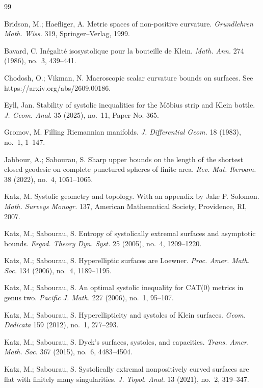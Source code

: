 \documentclass[12pt,reqno]{amsart}
\theoremstyle{definition}
\numberwithin{equation}{section}
\numberwithin{equation}{section}
\begin{document}
\begin{thebibliography}{99}

 Bridson, M.; Haefliger, A. Metric spaces of non-positive
  curvature.  \emph{Grundlehren Math. Wiss.} 319, Springer--Verlag,
  1999.

Bavard, C. In\'egalit\'e isosystolique pour la bouteille de Klein.
\emph{Math. Ann.} 274 (1986), no.~3, 439--441.

Chodosh, O.; Vikman, N. Macroscopic scalar curvature bounds on surfaces.
See https://arxiv.org/abs/2609.00186.

 Eyll, Jan.  Stability of systolic inequalities for the
  Möbius strip and Klein bottle.  \emph{J. Geom. Anal}. 35 (2025),
  no.~11, Paper No. 365.

Gromov, M. Filling Riemannian manifolds. 
\emph{J. Differential Geom.} 18 (1983), no.~1, 1--147.

Jabbour, A.; Sabourau, S. Sharp upper bounds on the length of the shortest closed geodesic on complete punctured spheres of finite area.
\emph{Rev. Mat. Iberoam.} 38 (2022), no.~4, 1051--1065.

Katz, M. Systolic geometry and topology. With an appendix by Jake P. Solomon.
\emph{Math. Surveys Monogr.} 137, American Mathematical Society, Providence, RI, 2007.

Katz, M.; Sabourau, S. Entropy of systolically extremal surfaces and asymptotic bounds.
\emph{Ergod. Theory Dyn. Syst.} 25 (2005), no.~4, 1209--1220.

Katz, M.; Sabourau, S. Hyperelliptic surfaces are Loewner.
\emph{Proc. Amer. Math. Soc.} 134 (2006), no.~4, 1189--1195.

Katz, M.; Sabourau, S. An optimal systolic inequality for CAT(0) metrics in genus two.
\emph{Pacific J. Math.} 227 (2006), no.~1, 95--107.

Katz, M.; Sabourau, S. Hyperellipticity and systoles of Klein surfaces.
\emph{Geom. Dedicata} 159 (2012), no.~1, 277--293.

Katz, M.; Sabourau, S. Dyck's surfaces, systoles, and capacities.
\emph{Trans. Amer. Math. Soc.} 367 (2015), no.~6, 4483--4504. 

Katz, M.; Sabourau, S. Systolically extremal nonpositively curved surfaces are flat with finitely many singularities.  
\emph{J. Topol. Anal.} 13 (2021), no.~2, 319--347.


\end{thebibliography}
\end{document}
